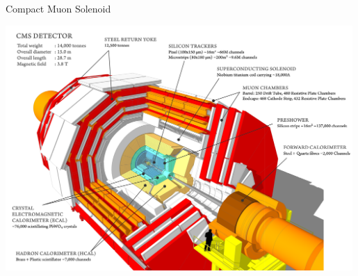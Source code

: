 \documentclass[pdf, 9pt]{beamer}
\begin{document}
  \begin{frame}{Compact Muon Solenoid}
    \begin{center}
      \includegraphics[width=0.99\textwidth, height=0.9\textheight]{figs/cms/cms_120918_03.png}
    \end{center}
  \end{frame}
\end{document}
